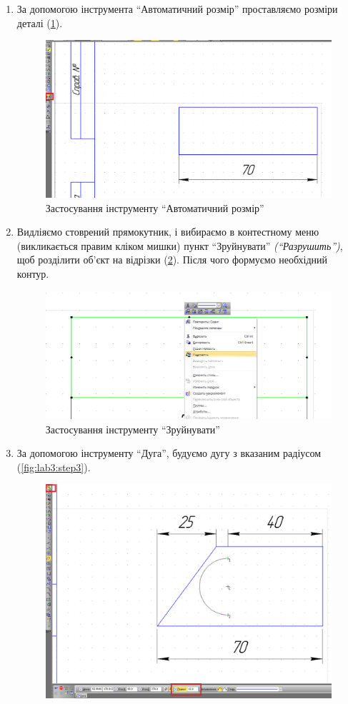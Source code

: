 \begin{enumerate}[leftmargin=*]
\item За допомогою інструмента ``Автоматичний розмір'' проставляємо розміри деталі
  (\ref{fig:lab3:dimentions}).
  \begin{figure}[!ht]
    \centering \includegraphics[width=0.9\linewidth]{./images/lab3/step2.png}
    \caption{Застосування інструменту ``Автоматичний розмір''}
    \label{fig:lab3:dimentions} 
  \end{figure}
\item Видліяємо стоврений прямокутник, і вибираємо в контестному меню (викликається правим кліком
  мишки) пункт ``Зруйнувати'' \textit{(``Разрушить'')}, щоб розділити об’єкт на відрізки
  (\ref{fig:lab3:dismantle}). Після чого формуємо необхідний контур.
  \begin{figure}[!ht]
    \centering \includegraphics[width=0.9\linewidth]{./images/lab3/step3.png}
    \caption{Застосування інструменту ``Зруйнувати''}
    \label{fig:lab3:dismantle} 
  \end{figure}
\item За допомогою інструменту ``Дуга'', будуємо дугу з вказаним радіусом (\ref{fig:lab3:step3}).
  \begin{figure}[!ht]
    \centering \includegraphics[width=0.9\linewidth]{./images/lab3/step4.png}

\end{figure}
\end{enumerate}
